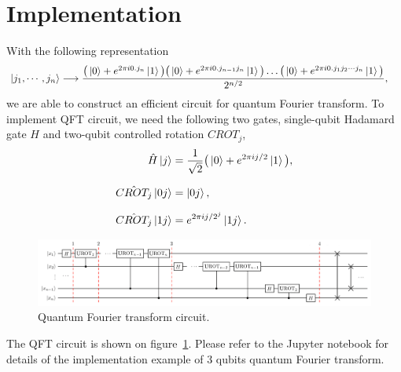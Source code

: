 \documentclass[a4paper]{article}
\begin{document}
\section{Implementation}
\label{sec:Implement}
With the following representation
    \begin{equation} \label{eq:eq4}
    \setlength{\jot}{10pt}
    \begin{aligned}
        \ket{j_1, \cdots, j_n} &\longrightarrow   \frac { \big( \ket{0} + e^{2 \pi i 0.j_n} \ket{1} \big)   \big( \ket{0} + e^{2 \pi i 0.j_{n-1} j_n} \ket{1} \big)   \dotso   \big( \ket{0} + e^{2 \pi i 0.j_1 j_2 \cdots j_n} \ket{1} \big) } {2^{n/2}},
    \end{aligned}
    \end{equation}
we are able to construct an efficient circuit for quantum Fourier transform. To implement QFT circuit, we need the following two gates, single-qubit Hadamard gate $H$ and two-qubit controlled rotation $CROT_j$,
    \begin{equation} \label{eq:eq5}
    \setlength{\jot}{10pt}
    \begin{aligned}
        \hat{H} \ket{j}   &=   \frac{1}{\sqrt{2}}   \big( \ket{0}   +   e^{2 \pi i j/2 } \ket{1} \big), \\
        \hat{CROT_j} \ket{0j}   &=   \ket{0j}, \\
        \hat{CROT_j} \ket{1j}   &=   e^{2 \pi i j / 2^j} \ket{1j}.
    \end{aligned}
    \end{equation}
    
    \begin{figure}	
        \centering
            \includegraphics [width=\textwidth, height=\textheight, keepaspectratio] {qft.png}
        \caption{Quantum Fourier transform circuit. \cite{Qiskit-Textbook}}
        \label{fig:qft}
    \end{figure}

The QFT circuit is shown on figure~\ref{fig:qft}. Please refer to the Jupyter notebook for details of the implementation example of 3 qubits quantum Fourier transform.




\end{document}
